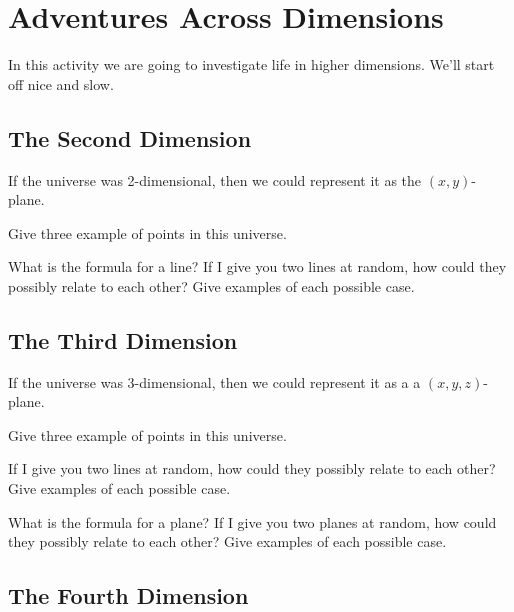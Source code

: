 \newpage
\section{Adventures Across Dimensions}	

In this activity we are going to investigate life in higher
dimensions. We'll start off nice and slow.



\subsection*{The Second Dimension}

If the universe was 2-dimensional, then we could represent it as the $(x,y)$-plane. 

\begin{prob}
Give three example of points in this universe.
\end{prob}


\begin{prob}
What is the formula for a line? If I give you two lines at random, how
could they possibly relate to each other? Give examples of each
possible case.
\end{prob}





\subsection*{The Third Dimension}

If the universe was 3-dimensional, then we could represent it as a
a $(x,y,z)$-plane.

\begin{prob}
Give three example of points in this universe.
\end{prob}

\begin{prob}
If I give you two lines at random, how could they possibly relate to
each other? Give examples of each possible case.
\end{prob}


\begin{prob}
What is the formula for a plane? If I give you two planes at random,
how could they possibly relate to each other? Give examples of each
possible case.
\end{prob}


\subsection*{The Fourth Dimension}

